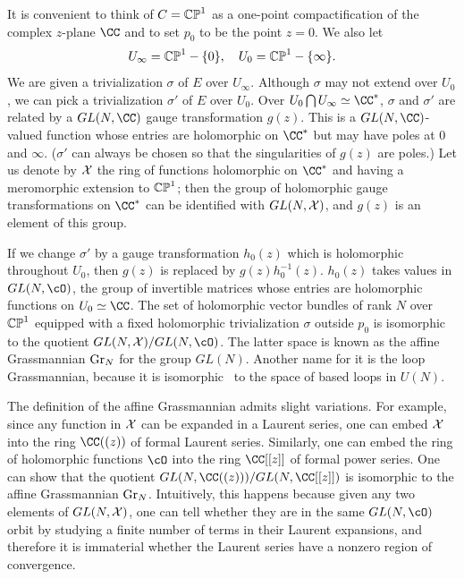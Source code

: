 It is convenient to think of $C=\Bbb{CP}^1$ as a one-point
compactification of the complex $z$-plane $\CC$ and to set $p_0$
to be the point $z=0$. We also let %
\setcounter{equation}{27}
\begin{equation}\label{eq:jmj}
U_\infty=\Bbb{CP}^1-\{0\},\quad U_0=\Bbb{CP}^1-\{\infty\} .
\end{equation}
 We
are given a trivialization $\sigma$ of $E$ over $U_\infty$.
Although $\sigma$ may not extend over $U_0$, we can pick a
trivialization $\sigma'$ of $E$ over $U_0$. Over $U_0\bigcap
U_\infty\simeq\CC^*$, $\sigma $ and $\sigma'$ are related by a
$GL(N,\CC)$ gauge transformation $g(z)$. This is a
$GL(N,\CC)$-valued function whose entries are holomorphic on
$\CC^*$ but may have poles at $0$ and $\infty$. ($\sigma'$ can
always be chosen so that the singularities of $g(z)$ are poles.)
Let us denote by ${\cal X}$ the ring of functions holomorphic on
$\CC^*$ and having a meromorphic extension to $\Bbb{CP}^1$; then
the group of holomorphic gauge transformations on $\CC^*$ can be
identified with $GL(N,{\cal X})$, and $g(z)$ is an element of this
group.

If we change $\sigma'$ by a gauge transformation $h_0(z)$ which is
holomorphic throughout $U_0$, then $g(z)$ is replaced by
$g(z)h_0^{-1}(z)$.  $h_0(z)$ takes values in $GL(N,\cO)$, the
group of invertible matrices whose entries are holomorphic
functions on $U_0\simeq \CC$. The set of holomorphic vector
bundles of rank $N$ over $\Bbb{CP}^1$ equipped with a fixed
holomorphic trivialization $\sigma$ outside $p_0$ is isomorphic to
the quotient $GL(N,{\cal X})/GL(N,\cO)$. The latter space is known
as the affine Grassmannian ${\rm Gr}_N$ for the group $GL(N)$.
Another name for it is the loop Grassmannian, because it is
isomorphic \cite{ref122}\ to the space of based loops in $U(N)$.

The definition of the affine Grassmannian admits slight
variations. For example, since any function in ${\cal X}$ can be
expanded in a Laurent series, one can embed ${\cal X}$ into the
ring $\CC((z))$ of formal Laurent series. Similarly, one can embed
the ring of holomorphic functions $\cO$ into the ring $\CC[[z]]$
of formal power series. One can show that the quotient
$GL(N,\CC((z)))/GL(N,\CC[[z]])$ is isomorphic to the affine
Grassmannian ${\rm Gr}_N$. Intuitively, this happens because given
any two elements of $GL(N,{\cal X})$, one can tell whether they
are in the same $GL(N,\cO)$ orbit by studying a finite number of
terms in their Laurent expansions, and therefore it is immaterial
whether the Laurent series have a nonzero region of convergence.

